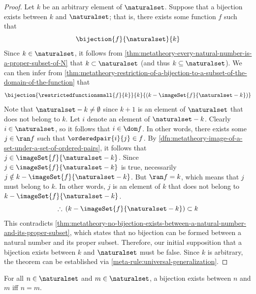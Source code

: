 \begin{proof}
    Let \( k \) be an arbitrary element of \( \naturalset \).
    Suppose that a bijection exists between \( k \) and \( \naturalset \); that is, there exists some function \( f \)
    such that
    \begin{equation*}
        \bijection{f}{\naturalset}{k}
    \end{equation*}
    Since \( k \in \naturalset \), it follows from \cref{thm:metatheory-every-natural-number-is-a-proper-subset-of-N} that
    \( k \subset \naturalset \) (and thus \( k \subseteq \naturalset \)).
    We can then infer from \cref{thm:metatheory-restriction-of-a-bijection-to-a-subset-of-the-domain-of-the-function} that
    \begin{equation*}
        \bijection{ \restrictedfunctionsmall{f}{k} }{k}{ \mleft(  k - \imageSet{f}{\naturalset - k} \mright) }
    \end{equation*}
    Note that \( \naturalset - k \neq \emptyset \) since \( k + 1 \) is an element of \( \naturalset \) that does not belong to \( k \).
    Let \( i \) denote an element of \( \naturalset - k \).
    Clearly \( i \in \naturalset \), so it follows that \( i \in \dom f \).
    In other words, there exists some \( j \in \ran f \) such that \( \orderedpair{i}{j} \in f \).
    By \cref{dfn:metatheory-image-of-a-set-under-a-set-of-ordered-pairs}, it follows that \( j \in \imageSet{f}{\naturalset - k} \).
    Since \( j \in \imageSet{f}{\naturalset - k} \) is true, necessarily \( j \notin k - \imageSet{f}{\naturalset - k} \).
    But \( \ran f = k \), which means that \( j \) must belong to \( k \).
    In other words, \( j \) is an element of \( k \) that does not belong to \( k - \imageSet{f}{\naturalset - k} \).
    \begin{equation*}
        \therefore \, \mleft( k - \imageSet{f}{\naturalset - k} \mright) \subset k
    \end{equation*}
    This contradicts \cref{thm:metatheory-no-bijection-exists-between-a-natural-number-and-its-proper-subset}, which states that
    no bijection can be formed between a natural number and its proper subset.
    Therefore, our initial supposition that a bijection exists between \( k \) and \( \naturalset \) must be false.
    Since \( k \) is arbitrary, the theorem can be established via \cref{meta-rule:universal-generalization}.
\end{proof}

\begin{thm}
     \label{thm:metatheory-a-bijection-exists-between-two-natural-numbers-iff-they-are-equal}
    For all \( n \in \naturalset \) and \( m \in \naturalset \), a bijection exists between \( n \) and \( m \) iff \( n = m \).
\end{thm}

